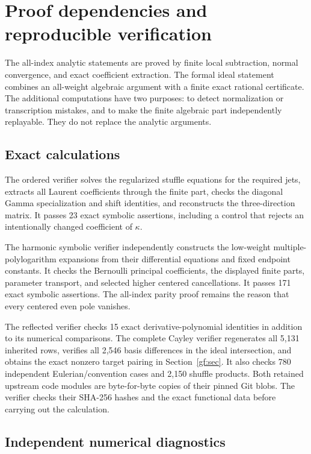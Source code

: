 \section{Proof dependencies and reproducible verification}
\label{verification:section}

The all-index analytic statements are proved by finite local
subtraction, normal convergence, and exact coefficient extraction.
The formal ideal statement combines an all-weight algebraic argument
with a finite exact rational certificate. The additional computations
have two purposes: to detect normalization or transcription mistakes,
and to make the finite algebraic part independently replayable.
They do not replace the analytic arguments.

\subsection{Exact calculations}

The ordered verifier solves the regularized stuffle equations for the
required jets, extracts all Laurent coefficients through the finite
part, checks the diagonal Gamma specialization and shift identities,
and reconstructs the three-direction matrix. It passes 23 exact
symbolic assertions, including a control that rejects an intentionally
changed coefficient of $\kappa$.

The harmonic symbolic verifier independently constructs the low-weight
multiple-polylogarithm expansions from their differential equations
and fixed endpoint constants. It checks the Bernoulli principal
coefficients, the displayed finite parts, parameter transport, and
selected higher centered cancellations. It passes 171 exact symbolic
assertions. The all-index parity proof remains the reason that every
centered even pole vanishes.

The reflected verifier checks 15 exact derivative-polynomial identities
in addition to its numerical comparisons. The complete Cayley verifier
regenerates all 5,131 inherited rows, verifies all 2,546 basis
differences in the ideal intersection, and obtains the exact nonzero
target pairing in Section~\ref{gf:sec}. It also checks 780 independent
Eulerian/convention cases and 2,150 shuffle products. Both retained
upstream code modules are byte-for-byte copies of their pinned Git
blobs. The verifier checks their SHA-256 hashes and the exact
functional data before carrying out the calculation.

\subsection{Independent numerical diagnostics}


